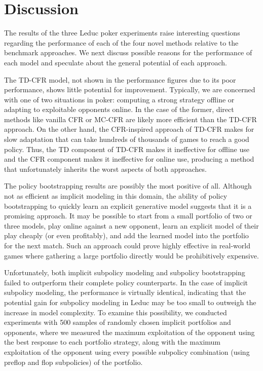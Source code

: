 \documentclass{aamas2013}
\begin{document}
\section{Discussion}
The results of the three Leduc poker experiments raise interesting questions regarding the performance of each of the four novel methods relative to the benchmark approaches. We next discuss possible reasons for the performance of each model and speculate about the general potential of each approach.

The TD-CFR model, not shown in the performance figures due to its poor performance, shows little potential for improvement. Typically, we are concerned with one of two situations in poker: computing a strong strategy offline or adapting to exploitable opponents online. In the case of the former, direct methods like vanilla CFR or MC-CFR are likely more efficient than the TD-CFR approach. On the other hand, the CFR-inspired approach of TD-CFR makes for slow adaptation that can take hundreds of thousands of games to reach a good policy. Thus, the TD component of TD-CFR makes it ineffective for offline use and the CFR component makes it ineffective for online use, producing a method that unfortunately inherits the worst aspects of both approaches.

The policy bootstrapping results are possibly the most positive of all. Although not as efficient as implicit modeling in this domain, the ability of policy bootstrapping to quickly learn an explicit generative model suggests that it is a promising approach. It may be possible to start from a small portfolio of two or three models, play online against a new opponent, learn an explicit model of their play cheaply (or even profitably), and add the learned model into the portfolio for the next match. Such an approach could prove highly effective in real-world games where gathering a large portfolio directly would be prohibitively expensive.

Unfortunately, both implicit subpolicy modeling and subpolicy bootstrapping failed to outperform their complete policy counterparts. In the case of implicit subpolicy modeling, the performance is virtually identical, indicating that the potential gain for subpolicy modeling in Leduc may be too small to outweigh the increase in model complexity. To examine this possibility, we conducted experiments with 500 samples of randomly chosen implicit portfolios and opponents, where we measured the maximum exploitation of the opponent using the best response to each portfolio strategy, along with the maximum exploitation of the opponent using every possible subpolicy combination (using preflop and flop subpolicies) of the portfolio.
\end{document}
